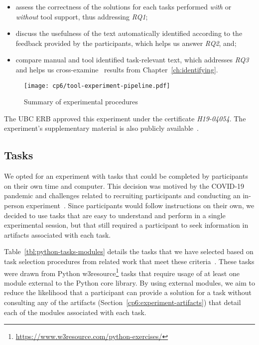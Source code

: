 \begin{itemize}
    \item assess the correctness of the solutions for each tasks performed \textit{with} or \textit{without} tool support, thus addressing \textit{RQ1};
     
    \item discuss the usefulness of the text automatically identified  according to the feedback provided by the participants, which helps us answer \textit{RQ2}, and;

    \item compare manual and tool identified task-relevant text, which addresses \textit{RQ3} and helps us cross-examine~\cite{easterbrook2008} results from Chapter~\ref{ch:identifying}. 
\end{itemize}
 


\begin{figure}[h!]
\centering
\texttt{[image: cp6/tool-experiment-pipeline.pdf]}
\caption{Summary of experimental procedures}
\label{fig:tool-experiment-procedures}
\end{figure}



The \acs{UBC} \acs{ERB} approved this experiment under the certificate \textit{H19-04054}.
The experiment's supplementary material is also publicly available~\cite{cp6_supplementary_material}.



\subsection{Tasks}
\label{cp6:tasks}


We opted for an experiment with tasks that could be completed by participants on their own time and computer.
This decision was motived by the COVID-19 pandemic and challenges related to recruiting participants and conducting an in-person experiment~\cite{russo2021a, russo2021b}. 
Since participants would follow instructions on their own, we decided to use tasks that are easy to understand and perform in a single experimental session, but that still required a participant  
to seek information in artifacts associated with each task.


Table~\ref{tbl:python-tasks-modules} details the tasks that we have selected based on task selection procedures from related work that meet these criteria~\cite{thiselton2019}. 
These tasks were drawn from
Python w3resource\footnote{\url{https://www.w3resource.com/python-exercises/}} tasks
that require usage of at least one module external to the Python core library.
By using external modules, we aim to reduce the likelihood that a participant 
can provide a solution for a task without consulting any of the artifacts (Section~\ref{cp6:experiment-artifacts})
that detail each of the modules associated with each task. 


